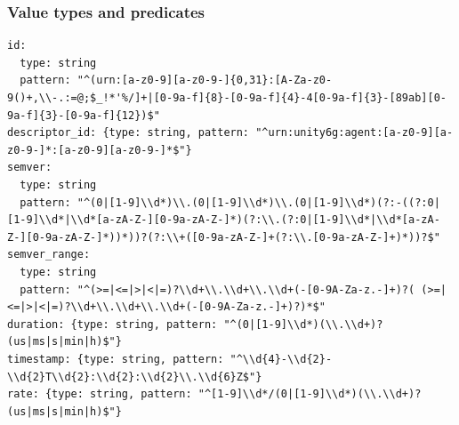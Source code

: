 \hypertarget{a.1.5-value-types-and-predicates}{%
\subsubsection{Value types and predicates}\label{a.1.5-value-types-and-predicates}}

\begin{verbatim}
id:
  type: string
  pattern: "^(urn:[a-z0-9][a-z0-9-]{0,31}:[A-Za-z0-9()+,\\-.:=@;$_!*'%/]+|[0-9a-f]{8}-[0-9a-f]{4}-4[0-9a-f]{3}-[89ab][0-9a-f]{3}-[0-9a-f]{12})$"
descriptor_id: {type: string, pattern: "^urn:unity6g:agent:[a-z0-9][a-z0-9-]*:[a-z0-9][a-z0-9-]*$"}
semver:
  type: string
  pattern: "^(0|[1-9]\\d*)\\.(0|[1-9]\\d*)\\.(0|[1-9]\\d*)(?:-((?:0|[1-9]\\d*|\\d*[a-zA-Z-][0-9a-zA-Z-]*)(?:\\.(?:0|[1-9]\\d*|\\d*[a-zA-Z-][0-9a-zA-Z-]*))*))?(?:\\+([0-9a-zA-Z-]+(?:\\.[0-9a-zA-Z-]+)*))?$"
semver_range:
  type: string
  pattern: "^(>=|<=|>|<|=)?\\d+\\.\\d+\\.\\d+(-[0-9A-Za-z.-]+)?( (>=|<=|>|<|=)?\\d+\\.\\d+\\.\\d+(-[0-9A-Za-z.-]+)?)*$"
duration: {type: string, pattern: "^(0|[1-9]\\d*)(\\.\\d+)?(us|ms|s|min|h)$"}
timestamp: {type: string, pattern: "^\\d{4}-\\d{2}-\\d{2}T\\d{2}:\\d{2}:\\d{2}\\.\\d{6}Z$"}
rate: {type: string, pattern: "^[1-9]\\d*/(0|[1-9]\\d*)(\\.\\d+)?(us|ms|s|min|h)$"}

\end{verbatim}
